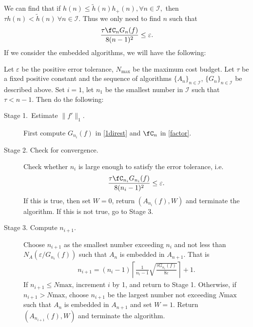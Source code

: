 We can find that if $h(n) \leq \tilde{h}(n) h_{+}(n), \forall n \in \mathcal{I},$ then $ \tau h(n)< \tilde{h}(n) \ \forall n \in \mathcal{I}.$
Thus we only need to find $n$ such that  \[
\frac{\tau \fC_n G_{n}(f)}{8(n-1)^2} \le \varepsilon.
\]
If we consider the embedded algorithms, we will have the following:
\begin{algo} \label{multistageintegalgo}
 Let $\varepsilon$ be the positive error tolerance, $N_{\text{max}}$ be the maximum cost budget. Let $\tau$ be a fixed positive constant and the sequence of algorithms $\{A_n\}_{n\in \mathcal{I}}$, $\{G_n\}_{n\in \mathcal{I}}$ be described above. Set $i=1$, let $n_1$ be the smallest number in $\mathcal{I}$ such that $\tau < n-1$. Then do the following:
\begin{description}
\item[Stage 1.\ Estimate {$\|f'\|_{1}$}.] First compute $G_{n_i}(f)$ in \eqref{1direst} and $\fC_n$ in \eqref{factor}.

\item[Stage 2. Check for convergence.] Check whether $n_i$ is large enough to satisfy the error tolerance, i.e.
    \begin{align*}
      \frac{\tau \fC_{n_i} G_{n_i}(f)}{8(n_i-1)^2} \le \varepsilon.
    \end{align*}
    If this is true, then set $W=0$, return $(A_{n_i}(f),W)$ and terminate the algorithm. If this is not true, go to Stage 3.

\item[Stage 3. Compute $n_{i+1}$.] Choose $n_{i+1}$ as the smallest number exceeding $n_i$ and not less than $N_A(\varepsilon/G_{n_i}(f))$ such that $A_n$ is embedded in $A_{n+1}$. That is
    \begin{align*}
      n_{i+1}=(n_i-1)\left\lceil\frac{1}{n_{i}-1}\sqrt{\frac{\tau G_{n_i}(f)}{8\varepsilon}}\right\rceil+1.
    \end{align*}
    If $n_{i+1}\leq N{\text{max}}$, increment $i$ by 1, and return to Stage 1. Otherwise, if $n_{i+1}> N{\text{max}}$, choose $n_{i+1}$ be the largest number not exceeding $N{\text{max}}$ such that $A_n$ is embedded in $A_{n+1}$ and set $W=1$. Return $(A_{n_{i+1}}(f),W)$ and terminate the algorithm.
\end{description}
\end{algo}

